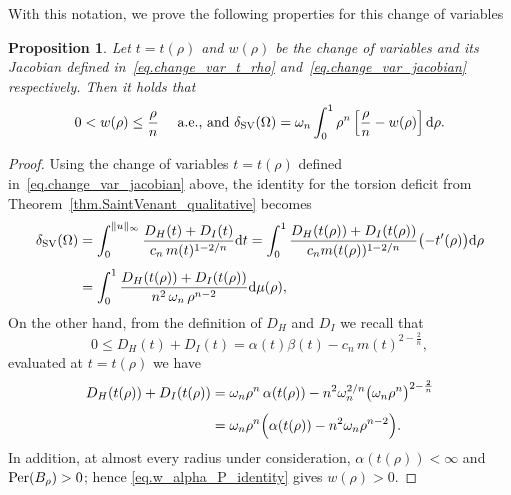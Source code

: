 \documentclass[11pt]{amsart}
\newcommand{\propname}{Proposition}
\theoremstyle{plain}
\newtheorem{proposition}[theorem]{\propname}
\theoremstyle{definition}
\newcommand{\eqdef}{\overset{\text{def.}}{=}}
\def\dd{{\rm d}}
\newcommand\Per{\mathop{\rm Per}}
\newcommand\SV{\mathop{\rm SV}}
\begin{document}
With this notation, we prove the following properties for this change of variables
\begin{proposition}\label{prop.various_estimates}
Let $t = t(\rho)$ and $w(\rho)$ be the change of variables and its Jacobian defined in~\eqref{eq.change_var_t_rho} and~\eqref{eq.change_var_jacobian} respectively. Then it holds that
\[
  0<w(\rho)\le\frac{\rho}{n}\quad\text{ a.e., and }
  \delta_{\SV}(\Omega)
  =
  \omega_n
  \int_0^1\rho^n\left[\frac{\rho}{n}-w(\rho)\right]\dd\rho.
\]
\end{proposition}
\begin{proof}
  Using the change of variables $t = t(\rho)$ defined in~\eqref{eq.change_var_jacobian} above, the identity for the torsion deficit from Theorem~\ref{thm.SaintVenant_qualitative} becomes
\begin{align*}
  \delta_{\SV}(\Omega)
  &=\int_0^{\|u\|_\infty}\frac{D_H(t)+D_I(t)}{c_n\,m(t)^{1-2/n}}\dd t
  =\int_0^1\frac{D_H(t(\rho))+D_I(t(\rho))}{c_n m(t(\rho))^{1-2/n}}
     \bigl(-t'(\rho)\bigr)\dd \rho \\[4pt]
  &=\int_0^1\frac{D_H(t(\rho))+D_I(t(\rho))}{n^2\,\omega_n\,\rho^{n-2}}\dd \mu(\rho),
\end{align*}
On the other hand, from the definition of $D_H$ and $D_I$ we recall that
\[
  0 \le D_H(t)+D_I(t)=\alpha(t)\beta(t)-c_n\,m(t)^{2-\frac{2}{n}},
\]
evaluated at $t=t(\rho)$ we have
\begin{align*}
  D_H(t(\rho))+D_I(t(\rho))
  &=\omega_n\rho^n\,\alpha(t(\rho))-n^2\omega_n^{2/n}\bigl(\omega_n\rho^n\bigr)^{2-\frac{2}{n}}\\[4pt]
  &=\omega_n\rho^n\Bigl(\alpha(t(\rho))-n^2\omega_n\rho^{n-2}\Bigr).
\end{align*}
In addition, at almost every radius under consideration, $\alpha(t(\rho))<\infty$ and
$\Per(B_\rho)>0$; hence \eqref{eq.w_alpha_P_identity} gives $w(\rho)>0$.


\end{proof}
\end{document}
